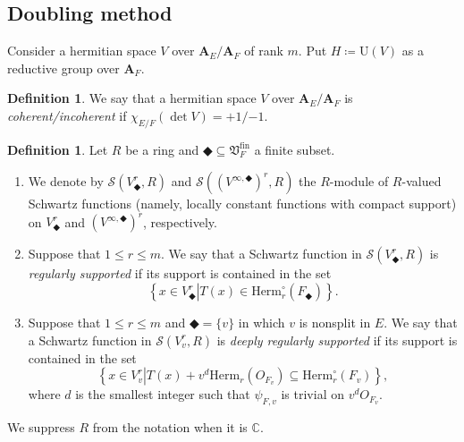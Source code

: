 \documentclass[12pt]{amsart}
\numberwithin{equation}{section}
\theoremstyle{plain}
\theoremstyle{definition}
\newtheorem{definition}[proposition]{Definition}
\theoremstyle{remark}
\renewcommand{\b}[1]{\mathbf{#1}}
\renewcommand{\d}[1]{\mathbb{#1}}
\newcommand{\f}[1]{\mathfrak{#1}}
\renewcommand{\r}[1]{\mathrm{#1}}
\newcommand{\s}[1]{\mathscr{#1}}
\renewcommand{\(}{\left(}
\renewcommand{\)}{\right)}
\renewcommand{\leq}{\leqslant}
\newcommand{\bA}{\b A}
\newcommand{\dC}{\d C}
\newcommand{\fV}{\f V}
\newcommand{\rU}{\r U}
\newcommand{\sS}{\s S}
\newcommand{\fin}{\r{fin}}
\newcommand{\Herm}{\r{Herm}}
\begin{document}
\subsection{Doubling method}
\label{ss:doubling}



Consider a hermitian space $V$ over $\bA_E/\bA_F$ of rank $m$. Put $H\coloneqq\rU(V)$ as a reductive group over $\bA_F$.



\begin{definition}\label{de:space_coherence}
We say that a hermitian space $V$ over $\bA_E/\bA_F$ is \emph{coherent/incoherent} if $\chi_{E/F}(\det V)=+1/{-1}$.
\end{definition}



\begin{definition}\label{de:regular_support}
Let $R$ be a ring and $\Diamondblack\subseteq\fV_F^\fin$ a finite subset.
\begin{enumerate}
  \item We denote by $\sS(V_\Diamondblack^r,R)$ and $\sS((V^{\infty,\Diamondblack})^r,R)$ the $R$-module of $R$-valued Schwartz functions (namely, locally constant functions with compact support) on $V_\Diamondblack^r$ and $(V^{\infty,\Diamondblack})^r$, respectively.

  \item Suppose that $1\leq r\leq m$. We say that a Schwartz function in $\sS(V_\Diamondblack^r,R)$ is \emph{regularly supported} if its support is contained in the set
      \[
      \left\{x\in V_\Diamondblack^r\left| T(x)\in\Herm_r^\circ(F_\Diamondblack) \right.\right\}.
      \]

  \item Suppose that $1\leq r\leq m$ and $\Diamondblack=\{v\}$ in which $v$ is nonsplit in $E$. We say that a Schwartz function in $\sS(V_v^r,R)$ is \emph{deeply regularly supported} if its support is contained in the set
      \[
      \left\{x\in V_v^r \left| T(x)+v^d\Herm_r(O_{F_v})\subseteq\Herm_r^\circ(F_v) \right.\right\},
      \]
      where $d$ is the smallest integer such that $\psi_{F,v}$ is trivial on $v^d O_{F_v}$.
\end{enumerate}
We suppress $R$ from the notation when it is $\dC$.
\end{definition}
\end{document}

